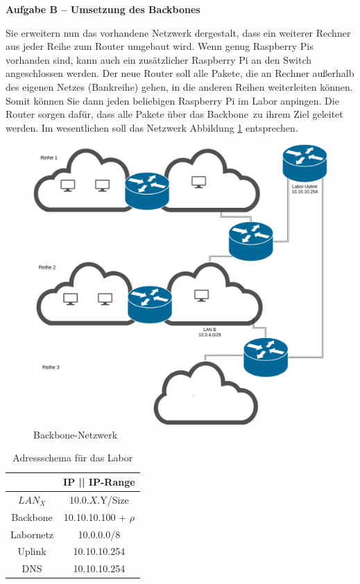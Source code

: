 \documentclass[paper=a4,fontsize=11pt]{scrartcl}%
\numberwithin{equation}{section}
\begin{document}
\begin{center}\Large{\textbf{Aufgabe B -- Umsetzung des Backbones}}\end{center}\vskip0.25in
Sie erweitern nun das vorhandene Netzwerk dergestalt, dass ein weiterer Rechner aus jeder Reihe zum Router umgebaut wird. Wenn genug Raspberry Pis vorhanden sind, kann auch ein zusätzlicher Raspberry Pi an den Switch angeschlossen werden. Der neue Router soll alle Pakete, die an Rechner außerhalb des eigenen Netzes (Bankreihe) gehen, in die anderen Reihen weiterleiten können. Somit können Sie dann jeden beliebigen Raspberry Pi im Labor anpingen. Die Router sorgen dafür, dass alle Pakete über das \glqq Backbone\grqq\ zu ihrem Ziel geleitet werden. Im wesentlichen soll das Netzwerk Abbildung \ref{backbone} entsprechen. 
\begin{figure}[H]
	\center
	\includegraphics[scale=0.2]{backbone}
	\caption{Backbone-Netzwerk}
	\label{backbone}
\end{figure}
\begin{table}[H]
\caption{Adressschema für das Labor}
\label{adress_scheme}
\centering
\begin{tabular}{|c|c|}\hline
 & \textbf{IP  || IP-Range} \\ \hline
 $LAN_X$ & 10.0.$X$.Y/Size \\ \hline
 Backbone & 10.10.10.100 + $\rho$ \\ \hline
 Labornetz & 10.0.0.0/8 \\ \hline
 Uplink & 10.10.10.254 \\ \hline
 DNS & 10.10.10.254 \\ \hline
\end{tabular}
\end{table} 
\end{document}
